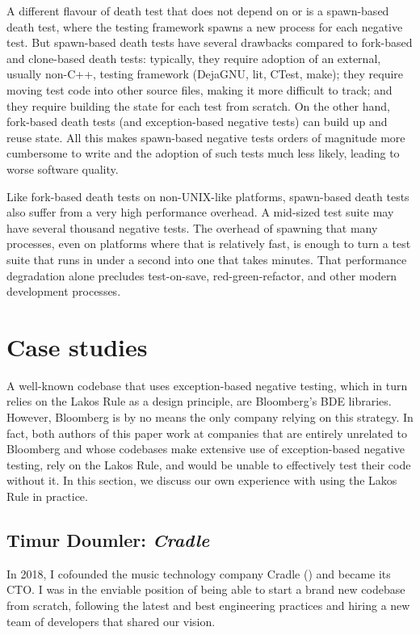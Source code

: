 A different flavour of death test that does not depend on  or  is a spawn-based death test, where the testing framework spawns a new process for each negative test. But spawn-based death tests have several drawbacks compared to fork-based and clone-based death tests: typically, they require adoption of an external, usually non-C++, testing framework (DejaGNU, lit, CTest, make); they require moving test code into other source files, making it more difficult to track; and they require building the state for each test from scratch. On the other hand, fork-based death tests (and exception-based negative tests) can build up and reuse state. All this makes spawn-based negative tests orders of magnitude more cumbersome to write and the adoption of such tests much less likely, leading to worse software quality.

Like fork-based death tests on non-UNIX-like platforms, spawn-based death tests also suffer from a very high performance overhead. A mid-sized test suite may have several thousand negative tests. The overhead of spawning that many processes, even on platforms where that is relatively fast, is enough to turn a test suite that runs in under a second into one that takes minutes. That performance degradation alone precludes test-on-save, red-green-refactor, and other modern development processes.

\section{Case studies}
\label{sec:casestudies}

A well-known codebase that uses exception-based negative testing, which in turn relies on the Lakos Rule as a design principle, are Bloomberg's BDE libraries. However, Bloomberg is by no means the only company relying on this strategy. In fact, both authors of this paper work at companies that are entirely unrelated to Bloomberg and whose codebases make extensive use of exception-based negative testing, rely on the Lakos Rule, and would be unable to effectively test their code without it. In this section, we discuss our own experience with using the Lakos Rule in practice.

\subsection{Timur Doumler: \emph{Cradle}}

In 2018, I cofounded the music technology company Cradle (\hyperref[https://cradle.app]{}) and became its CTO. I was in the enviable position of being able to start a brand new codebase from scratch, following the latest and best engineering practices and hiring a new team of developers that shared our vision.

